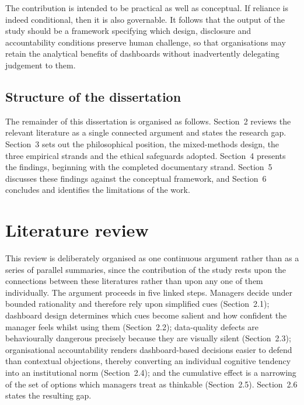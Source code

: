 \documentclass[11pt,a4paper]{article}
\numberwithin{figure}{section}
\numberwithin{table}{section}
\newcommand{\xref}[1]{\textcolor{citeblue}{#1}}         %
\begin{document}
The contribution is intended to be practical as well as conceptual. If reliance is indeed
conditional, then it is also governable. It follows that the output of the study should be a
framework specifying which design, disclosure and accountability conditions preserve human
challenge, so that organisations may retain the analytical benefits of dashboards without
inadvertently delegating judgement to them.

\subsection{Structure of the dissertation}

The remainder of this dissertation is organised as follows. \xref{Section~2} reviews the relevant
literature as a single connected argument and states the research gap. \xref{Section~3} sets out
the philosophical position, the mixed-methods design, the three empirical strands and the ethical
safeguards adopted. \xref{Section~4} presents the findings, beginning with the completed
documentary strand. \xref{Section~5} discusses these findings against the conceptual framework,
and \xref{Section~6} concludes and identifies the limitations of the work.

\section{Literature review}

This review is deliberately organised as one continuous argument rather than as a series of
parallel summaries, since the contribution of the study rests upon the connections between these
literatures rather than upon any one of them individually. The argument proceeds in five linked
steps. Managers decide under bounded rationality and therefore rely upon simplified cues
(\xref{Section~2.1}); dashboard design determines which cues become salient and how confident the
manager feels whilst using them (\xref{Section~2.2}); data-quality defects are behaviourally
dangerous precisely because they are visually silent (\xref{Section~2.3}); organisational
accountability renders dashboard-based decisions easier to defend than contextual objections,
thereby converting an individual cognitive tendency into an institutional norm
(\xref{Section~2.4}); and the cumulative effect is a narrowing of the set of options which
managers treat as thinkable (\xref{Section~2.5}). \xref{Section~2.6} states the resulting gap.
\end{document}
